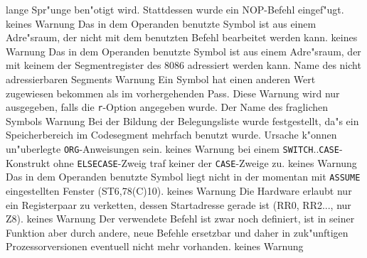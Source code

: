 \documentclass[12pt,a4paper,twoside]{report}
\newcommand{\tty}[1]{{\tt #1}}
\begin{document}
{\begin{description}
{                lange Spr"unge ben"otigt wird.  Stattdessen wurde ein
                NOP-Befehl eingef"ugt.}
               {keines}
               {Warnung}
               {Das in dem Operanden benutzte Symbol
                ist aus einem Adre"sraum, der nicht mit dem benutzten
                Befehl bearbeitet werden kann.}
               {keines}
               {Warnung}
               {Das in dem Operanden benutzte Symbol
                ist aus einem Adre"sraum, der mit keinem der Segmentregister
                des 8086 adressiert werden kann.}
               {Name des nicht adressierbaren Segments}
               {Warnung}
               {Ein Symbol hat einen anderen Wert zugewiesen
                bekommen als im vorhergehenden Pass.  Diese Warnung wird
                nur ausgegeben, falls die \tty{r}-Option angegeben wurde.}
               {Der Name des fraglichen Symbols}
               {Warnung}
               {Bei der Bildung der Belegungsliste wurde
                festgestellt, da"s ein Speicherbereich im Codesegment
                mehrfach benutzt wurde.  Ursache k"onnen un"uberlegte
                \tty{ORG}-Anweisungen sein.}
               {keines}
               {Warnung}
               {bei einem \tty{SWITCH}..\tty{CASE}-Konstrukt ohne
                \tty{ELSECASE}-Zweig traf keiner der \tty{CASE}-Zweige zu.}
               {keines}
               {Warnung}
               {Das in dem Operanden benutzte Symbol
                liegt nicht in der momentan mit \tty{ASSUME} eingestellten
                Fenster (ST6,78(C)10).}
               {keines}
               {Warnung}
               {Die Hardware erlaubt nur ein Registerpaar
                zu verketten, dessen Startadresse gerade ist (RR0, RR2...,
                nur Z8).}
               {keines}
               {Warnung}
               {Der verwendete Befehl ist zwar noch
                definiert, ist in seiner Funktion aber durch andere,
                neue Befehle ersetzbar und daher in zuk"unftigen
                Prozessorversionen eventuell nicht mehr vorhanden.}
               {keines}
               {Warnung}

\end{description}}
\end{document}
